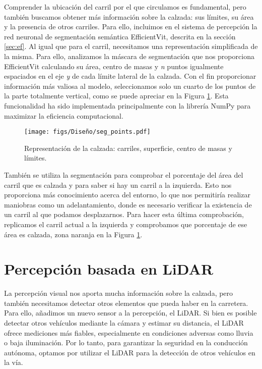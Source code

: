 Comprender la ubicación del carril por el que circulamos es fundamental, pero también buscamos obtener más información sobre la calzada: sus límites, su área y la presencia de otros carriles. Para ello, incluimos en el sistema de percepción la red neuronal de segmentación semántica EfficientVit, descrita en la sección \ref{sec:ef}. Al igual que para el carril, necesitamos una representación simplificada de la misma. Para ello, analizamos la máscara de segmentación que nos proporciona EfficientVit calculando su área, centro de masas y \textit{n} puntos igualmente espaciados en el eje \textit{y} de cada límite lateral de la calzada. Con el fin proporcionar información más valiosa al modelo, seleccionamos solo un cuarto de los puntos de la parte totalmente vertical, como se puede apreciar en la Figura \ref{fig:seg_params}. Esta funcionalidad ha sido implementada principalmente con la librería NumPy para maximizar la eficiencia computacional.
\begin{figure}[ht]
\centering
\texttt{[image: figs/Diseño/seg\_points.pdf]}
\caption{Representación de la calzada: carriles, superficie, centro de masas y límites.}
\label{fig:seg_params}
\end{figure}

También se utiliza la segmentación para comprobar el porcentaje del área del carril que es calzada y para saber si hay un carril a la izquierda. Esto nos proporciona más conocimiento acerca del entorno, lo que nos permitiría realizar maniobras como un adelantamiento, donde es necesario verificar la existencia de un carril al que podamos desplazarnos. Para hacer esta última comprobación, replicamos el carril actual a la izquierda y comprobamos que porcentaje de ese área es calzada, zona naranja en la Figura \ref{fig:seg_params}.

\section{Percepción basada en LiDAR}

La percepción visual nos aporta mucha información sobre la calzada, pero también necesitamos detectar otros elementos que pueda haber en la carretera. Para ello, añadimos un nuevo sensor a la percepción, el \ac{LiDAR}. Si bien es posible detectar otros vehículos mediante la cámara y estimar su distancia, el \ac{LiDAR} ofrece mediciones más fiables, especialmente en condiciones adversas como lluvia o baja iluminación. Por lo tanto, para garantizar la seguridad en la conducción autónoma, optamos por utilizar el \ac{LiDAR} para la detección de otros vehículos en la vía.

